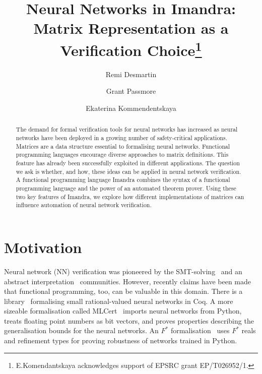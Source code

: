\documentclass[runningheads]{llncs}
\begin{document}
%
\title{Neural Networks in Imandra: Matrix Representation as a Verification Choice\thanks{E.Komendantskaya acknowledges support of EPSRC grant EP/T026952/1.}}
%
%
\author{Remi Desmartin \and
Grant Passmore\and
Ekaterina Kommendentskaya}
%
%
%
\maketitle              %
%
\begin{abstract}
The demand for formal verification tools for neural networks has increased as
neural networks have been deployed in a growing number of safety-critical
applications. Matrices are a data structure essential to formalising neural
networks. Functional programming languages encourage diverse approaches to
matrix definitions. This feature has already been successfully exploited in
different applications. The question we ask is whether, and how, these ideas can
be applied in neural network verification. A functional programming language
Imandra combines the syntax of a functional programming language and the power
of an automated theorem prover. Using these two key features of Imandra, we
explore how different implementations of matrices can influence automation of
neural network verification.

\end{abstract}
%
%
%

\section{Motivation}

Neural network (NN) verification was pioneered by the
SMT-solving~\cite{KaBaDiJuKo17Reluplex,HuangKWW17} and an abstract
interpretation~\cite{SinghGPV19,GeMiDrTsChVe18,AEHW20} communities. However, recently claims have been made that functional programming, too, can be valuable in this domain. 
 There is a library~\cite{MariaBLFGRG22}
formalising small rational-valued neural networks in Coq. A more sizeable
formalisation called MLCert~\cite{BS19} imports neural networks from Python, treats
floating point numbers as bit vectors, and proves properties describing the
generalisation bounds for the neural networks.
%
An $F^*$ %
%
formalisation~\cite{KokkeKKAA20} uses $F^*$ reals and
refinement types for proving robustness of networks trained in Python.
\end{document}
